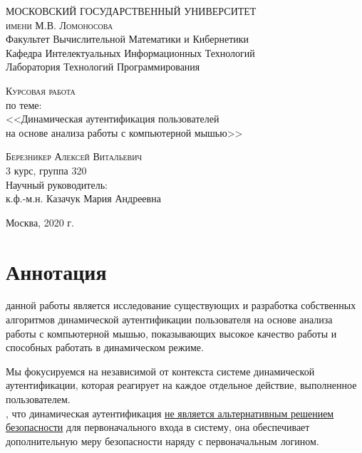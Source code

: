 \documentclass[12pt]{article}
\begin{document}
    \begin{titlepage}
        \begin{center}
            \textsc{
            \large
            МОСКОВСКИЙ ГОСУДАРСТВЕННЫЙ УНИВЕРСИТЕТ \\
            имени М.В. Ломоносова
            } \\
            [5mm]

            Факультет Вычислительной Математики и Кибернетики \\
            Кафедра Интелектуальных Информационных Технологий \\
            Лаборатория Технологий Программирования 
            \vfill
    
            \textsc{Курсовая работа} \\
            по теме: \\
            [5mm]
            {\LARGE
            <<Динамическая аутентификация пользователей \\
            на основе анализа работы с компьютерной мышью>>
            }
            \vfill
            \begin{flushright}
                \textsc{Березникер Алексей Витальевич} \\
                3 курс, группа 320 \\
                [5mm]
                Научный руководитель: \\
                к.ф.-м.н. Казачук Мария Андреевна \\
            \end{flushright}
            \vfill

            Москва, 2020 г.
        \end{center}
    \end{titlepage}



    \tableofcontents
    \newpage



    \section{Аннотация}
    \label{sec:Annotation}

     данной работы является исследование существующих и разработка собственных алгоритмов динамической аутентификации пользователя на основе анализа работы с компьютерной мышью, показывающих высокое качество работы и способных работать в динамическом режиме. \\
    \par Мы фокусируемся на независимой от контекста системе динамической аутентификации, которая реагирует на каждое отдельное действие, выполненное пользователем. \\
    , что динамическая аутентификация \uline{не является альтернативным решением безопасности} для первоначального входа в систему, она обеспечивает дополнительную меру безопасности наряду с первоначальным логином.
\end{document}
